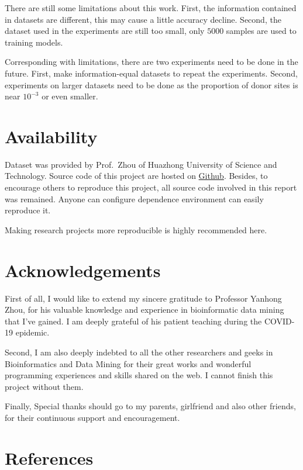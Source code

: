 \documentclass[11pt]{article}
\begin{document}
There are still some limitations about this work. First, the information
contained in datasets are different, this may cause a little accuracy
decline. Second, the dataset used in the experiments are still too
small, only \(5000\) samples are used to training models.

Corresponding with limitations, there are two experiments need to be
done in the future. First, make information-equal datasets to repeat
the experiments. Second, experiments on larger datasets need to be done
as the proportion of donor sites is near \(10^{-3}\) or even smaller.

    \hypertarget{availability}{%
\section{Availability}\label{availability}}

Dataset was provided by Prof.~Zhou of Huazhong University of Science
and Technology. Source code of this project are hosted on
\href{https://github.com/AdeBC/GSSR}{Github}. Besides, to encourage
others to reproduce this project, all source code involved in this
report was remained. Anyone can configure dependence environment can
easily reproduce it.

Making research projects more reproducible is highly recommended here.

    \hypertarget{acknowledgements}{%
\section{Acknowledgements}\label{acknowledgements}}

First of all, I would like to extend my sincere gratitude to Professor
Yanhong Zhou, for his valuable knowledge and experience in bioinformatic
data mining that I've gained. I am deeply grateful of his patient
teaching during the COVID-19 epidemic.

Second, I am also deeply indebted to all the other researchers and geeks
in Bioinformatics and Data Mining for their great works and wonderful
programming experiences and skills shared on the web. I cannot finish
this project without them.

Finally, Special thanks should go to my parents, girlfriend and also
other friends, for their continuous support and encouragement.

    \hypertarget{references}{%
\section{References}\label{references}}
\end{document}
